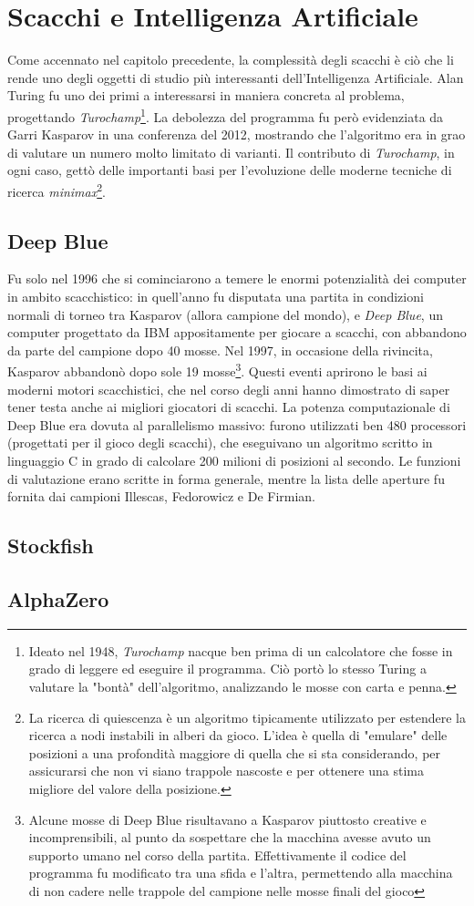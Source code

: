 \section{Scacchi e Intelligenza Artificiale}
Come accennato nel capitolo precedente, la complessità degli scacchi è ciò che li rende uno degli oggetti di studio più interessanti 
dell'Intelligenza Artificiale. Alan Turing fu uno dei primi a interessarsi in maniera concreta al problema, progettando 
\textit{Turochamp}\footnote{Ideato nel 1948, \textit{Turochamp} nacque ben prima di un calcolatore che fosse in grado di 
leggere ed eseguire il programma. Ciò portò lo stesso Turing a valutare la "bontà" dell'algoritmo, analizzando le mosse con carta e penna.}.
La debolezza del programma fu però evidenziata da Garri Kasparov in una conferenza del 2012, mostrando che l'algoritmo era 
in grao di valutare un numero molto limitato di varianti. Il contributo di \textit{Turochamp}, in ogni caso, gettò delle importanti basi 
per l'evoluzione delle moderne tecniche di ricerca \textit{minimax}\footnote{La ricerca di quiescenza è un algoritmo tipicamente utilizzato per estendere la ricerca a nodi instabili
in alberi da gioco. L'idea è quella di "emulare" delle posizioni a una profondità maggiore di quella che si sta considerando, per assicurarsi
che non vi siano trappole nascoste e per ottenere una stima migliore del valore della posizione.}. 
\subsection{Deep Blue}
Fu solo nel 1996 che si cominciarono a temere le enormi potenzialità dei computer in ambito scacchistico: in quell'anno fu disputata 
una partita in condizioni normali di torneo tra Kasparov (allora campione del mondo), e \textit{Deep Blue}, un computer progettato 
da IBM appositamente per giocare a scacchi, con abbandono da parte del campione dopo 40 mosse. Nel 1997, in occasione della rivincita, 
Kasparov abbandonò dopo sole 19 mosse\footnote{Alcune mosse di Deep Blue risultavano a Kasparov piuttosto creative e incomprensibili,
al punto da sospettare che la macchina avesse avuto un supporto umano nel corso della partita. Effettivamente il codice del programma 
fu modificato tra una sfida e l'altra, permettendo alla macchina di non cadere nelle trappole del campione nelle mosse finali del gioco}. 
Questi eventi aprirono le basi ai moderni motori scacchistici, che nel corso degli anni hanno dimostrato di saper tener testa anche 
ai migliori giocatori di scacchi.
La potenza computazionale di Deep Blue era dovuta al parallelismo massivo: furono utilizzati ben 480 processori (progettati per il gioco degli 
scacchi), che eseguivano un algoritmo scritto in linguaggio C in grado di calcolare 200 milioni di posizioni al secondo. Le funzioni di 
valutazione erano scritte in forma generale, mentre la lista delle aperture fu fornita dai campioni Illescas, Fedorowicz e De Firmian.
\subsection{Stockfish}
\subsection{AlphaZero}






\newpage